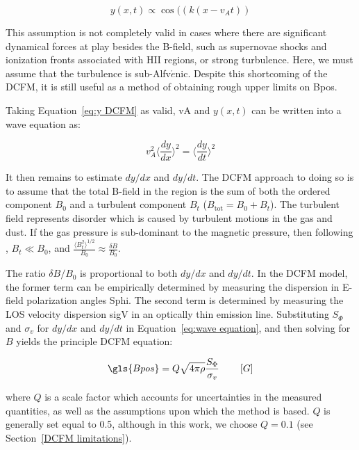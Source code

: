 \begin{equation}\label{eq:y DCFM}
  y(x,t) \propto \mathrm{\cos}({\left( k(x - v_{A}t) \right)}
\end{equation}

This assumption is not completely valid in cases where there are significant dynamical forces at play besides the B-field, such as supernovae shocks and ionization fronts associated with HII regions, or strong turbulence. Here, we must assume that the turbulence is sub-Alfv$\acute{e}$nic. Despite this shortcoming of the DCFM, it is still useful as a method of obtaining rough upper limits on \gls{Bpos}.

Taking Equation~\ref{eq:y DCFM} as valid, \gls{vA} and $y(x, t)$ can be written into a wave equation as:

\begin{equation}\label{eq:wave equation}
  v_{A}^{2} \bigg \langle \frac{dy}{dx}  \bigg \rangle ^{2} = \bigg \langle \frac{dy}{dt}  \bigg \rangle ^{2}
\end{equation}

It then remains to estimate $dy/dx$ and $dy/dt$. The DCFM approach to doing so is to assume that the total B-field in the region is the sum of both the ordered component $B_{0}$ and a turbulent component $B_{t}$ ($B_{\mathrm{tot}} = B_{0} + B_{t}$). The turbulent field represents disorder which is caused by turbulent motions in the gas and dust. If the gas pressure is sub-dominant to the magnetic pressure, then following \citet{hildebrand2009dispersion}, $B_{t} \ll B_{0}$, and $ \frac{\langle B_{t}^{2} \rangle ^{1/2}}{ B_{0} } \approx \frac{ \delta B }{ B_{0} }$.

The ratio $\delta B/ B_{0}$ is proportional to both $dy/dx$ and $dy/dt$. In the DCFM model, the former term can be empirically determined by measuring the dispersion in E-field polarization angles \gls{Sphi}. The second term is determined by measuring the LOS velocity dispersion \gls{sigV} in an optically thin emission line. Substituting $S_{\Phi}$ and $\sigma_{v}$ for $dy/dx$ and $dy/dt$ in Equation~\ref{eq:wave equation}, and then solving for $B$ yields the principle DCFM equation:

\begin{equation}\label{eq:DCFM 1}
    \gls{Bpos} = Q \sqrt{4 \pi \rho}\frac{S_{\Phi}}{\sigma_{v}} \qquad \left[ G \right]
\end{equation}

where $Q$ is a scale factor which accounts for uncertainties in the measured quantities, as well as the assumptions upon which the method is based. $Q$ is generally set equal to 0.5, although in this work, we choose $Q = 0.1$ (see Section~\ref{DCFM limitations}).

